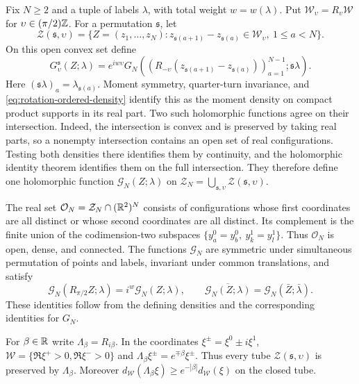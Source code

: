 Fix $N\ge2$ and a tuple of labels $\lambda$, with total weight
$w=w(\lambda)$. Put $\mathcal W_\upsilon=R_\upsilon\mathcal W$
for $\upsilon\in(\pi/2)\mathbb Z$. For a permutation $\mathfrak s$,
let
\[
 \mathcal Z(\mathfrak s,\upsilon)=
 \{Z=(z_1,\ldots,z_N):
       z_{\mathfrak s(a+1)}-z_{\mathfrak s(a)}
                    \in\mathcal W_\upsilon,\ 1\le a<N\}.
\]
On this open convex set define
\[
 G_\upsilon^{\mathfrak s}(Z;\lambda)=e^{iw\upsilon}
 G_N\left(
       (R_{-\upsilon}(z_{\mathfrak s(a+1)}-z_{\mathfrak s(a)}))_{a=1}^{N-1};
       \mathfrak s\lambda\right).
\]
Here $(\mathfrak s\lambda)_a=\lambda_{\mathfrak s(a)}$.
Moment symmetry, quarter-turn invariance, and
\eqref{eq:rotation-ordered-density} identify this as the moment
density on compact product supports in its real part.
Two such holomorphic functions agree on their intersection.
Indeed, the intersection is convex and is preserved by taking
real parts, so a nonempty intersection contains an open set of
real configurations. Testing both densities there identifies
them by continuity, and the holomorphic identity theorem
identifies them on the full intersection.
They therefore define one holomorphic function
$\mathcal G_N(Z;\lambda)$ on
$\mathcal Z_N=\bigcup_{\mathfrak s,\upsilon}\mathcal Z(\mathfrak s,\upsilon)$.

The real set $\mathcal O_N=\mathcal Z_N\cap(\mathbb R^2)^N$ consists
of configurations whose first coordinates are all distinct
or whose second coordinates are all distinct.
Its complement is the finite union of the codimension-two
subspaces
$\{y_a^0=y_b^0,\ y_k^1=y_l^1\}$.
Thus $\mathcal O_N$ is open, dense, and connected.
The functions $\mathcal G_N$ are symmetric under simultaneous
permutation of points and labels, invariant under common
translations, and satisfy
\[
 \mathcal G_N(R_{\pi/2}Z;\lambda)=i^w\mathcal G_N(Z;\lambda),
 \qquad
 \overline{\mathcal G_N(Z;\lambda)}
       =\mathcal G_N(\bar Z;\bar\lambda).
\]
These identities follow from the defining densities and
the corresponding identities for $G_N$.

For $\beta\in\mathbb R$ write $\Lambda_\beta=R_{i\beta}$.
In the coordinates $\xi^\pm=\xi^0\pm i\xi^1$,
$\mathcal W=\{\Re\xi^+>0,\Re\xi^->0\}$ and
$\Lambda_\beta\xi^\pm=e^{\mp\beta}\xi^\pm$.
Thus every tube $\mathcal Z(\mathfrak s,\upsilon)$ is preserved
by $\Lambda_\beta$. Moreover
$d_{\mathcal W}(\Lambda_\beta\xi)\ge
e^{-|\beta|}d_{\mathcal W}(\xi)$ on the closed tube.

